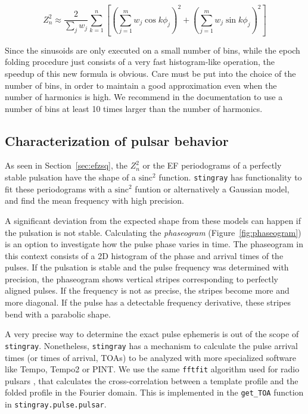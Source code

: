\documentclass[twocolumn]{aastex62}
\newcommand{\zsq}{\ensuremath{Z^2_n}\xspace}
\newcommand{\stingray}{\texttt{stingray}\xspace}
\begin{document}
\begin{equation}
\zsq \approx \dfrac{2}{\sum_j{w_j}} \sum_{k=1}^n \left[{\left(\sum_{j=1}^m w_j \cos k \phi_j\right)}^2 + {\left(\sum_{j=1}^m w_j \sin k \phi_j\right)}^2\right]
\end{equation}

Since the sinusoids are only executed on a small number of bins, while the epoch folding procedure just consists of a very fast histogram-like operation, the speedup of this new formula is obvious. 
Care must be put into the choice of the number of bins, in order to maintain a good approximation even when the number of harmonics is high. 
We recommend in the documentation to use a number of bins at least 10 times larger than the number of harmonics.

\subsection{Characterization of pulsar behavior}
\label{sec:ephem}
As seen in Section~\ref{sec:efzsq}, the \zsq or the EF periodograms of a perfectly stable pulsation have the shape of a $\mathrm{sinc}^2$ function.
\stingray has functionality to fit these periodograms with a $\mathrm{sinc}^2$ funtion or alternatively a Gaussian model, and find the mean frequency with high precision.

A significant deviation from the expected shape from these models can happen if the pulsation is not stable.
Calculating the \textit{phaseogram} (Figure~\ref{fig:phaseogram}) is an option to investigate how the pulse phase varies in time.
The phaseogram in this context consists of a 2D histogram of the phase and arrival times of the pulses. 
If the pulsation is stable and the pulse frequency was determined with precision, the phaseogram shows vertical stripes corresponding to perfectly aligned pulses.
If the frequency is not as precise, the stripes become more and more diagonal.
If the pulse has a detectable frequency derivative, these stripes bend with a parabolic shape.

A very precise way to determine the exact pulse ephemeris is out of the scope of \stingray. 
Nonetheless, \stingray has a mechanism to calculate the pulse arrival times (or times of arrival, TOAs) to be analyzed with more specialized software like Tempo, Tempo2 or PINT. 
We use the same \texttt{fftfit} algorithm used for radio pulsars \citep{Taylor92}, that calculates the cross-correlation between a template profile and the folded profile in the Fourier domain. 
This is implemented in the \texttt{get\_TOA} function in \texttt{stingray.pulse.pulsar}.
\end{document}
